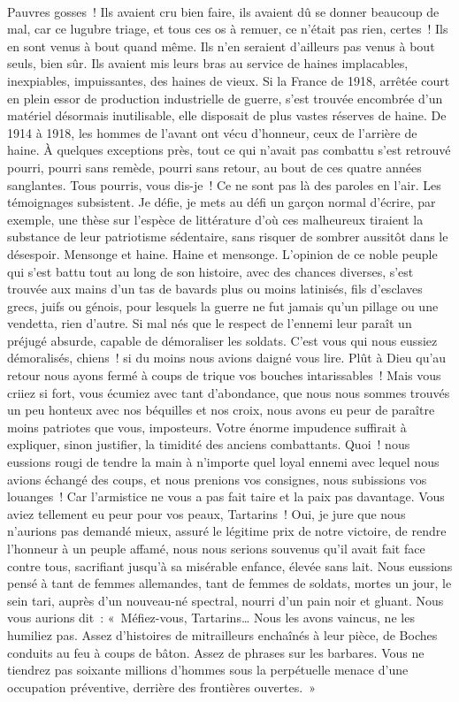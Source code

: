 \documentclass[french,twoside]{book} %
\newcommand{\astertri}{\medskip\par\centerline{\color{rubric}\large\selectfont{\syms ✻\,✻\,✻}}\medskip\par}%
\begin{document}
\astertri

\noindent  \par
Pauvres gosses ! Ils avaient cru bien faire, ils avaient dû se donner beaucoup de mal, car ce lugubre triage, et tous ces os à remuer, ce n’était pas rien, certes ! Ils en sont venus à bout quand même. Ils n’en seraient d’ailleurs pas venus à bout seuls, bien sûr. Ils avaient mis leurs bras au service de haines implacables, inexpiables, impuissantes, des haines de vieux. Si la France de 1918, arrêtée court en plein essor de production industrielle de guerre, s’est trouvée encombrée d’un matériel désormais inutilisable, elle disposait de plus vastes réserves de haine. De 1914 à 1918, les hommes de l’avant ont vécu d’honneur, ceux de l’arrière de haine. À quelques exceptions près, tout ce qui n’avait pas combattu s’est retrouvé pourri, pourri sans remède, pourri sans retour, au bout de ces quatre années sanglantes. Tous pourris, vous dis-je ! Ce ne sont pas là des paroles en l’air. Les témoignages subsistent. Je défie, je mets au défi un garçon normal d’écrire, par exemple, une thèse sur l’espèce de littérature d’où ces malheureux tiraient la substance de leur patriotisme sédentaire, sans risquer de sombrer aussitôt dans le désespoir. Mensonge et haine. Haine et mensonge. L’opinion de ce noble peuple qui s’est battu tout au long de son histoire, avec des chances diverses, s’est trouvée aux mains d’un tas de bavards plus ou moins latinisés, fils d’esclaves grecs, juifs ou génois, pour lesquels la guerre ne fut jamais qu’un pillage ou une vendetta, rien d’autre. Si mal nés que le respect de l’ennemi leur paraît un préjugé absurde, capable de démoraliser les soldats. C’est vous qui nous eussiez démoralisés, chiens ! si du moins nous avions daigné vous lire. Plût à Dieu qu’au retour nous ayons fermé à coups de trique vos bouches intarissables ! Mais vous criiez si fort, vous écumiez avec tant d’abondance, que nous nous sommes trouvés un peu honteux avec nos béquilles et nos croix, nous avons eu peur de paraître moins patriotes que vous, imposteurs. Votre énorme impudence suffirait à expliquer, sinon justifier, la timidité des anciens combattants. Quoi ! nous eussions rougi de tendre la main à n’importe quel loyal ennemi avec lequel nous avions échangé des coups, et nous prenions vos consignes, nous subissions vos louanges ! Car l’armistice ne vous a pas fait taire et la paix pas davantage. Vous aviez tellement eu peur pour vos peaux, Tartarins ! Oui, je jure que nous n’aurions pas demandé mieux, assuré le légitime prix de notre victoire, de rendre l’honneur à un peuple affamé, nous nous serions souvenus qu’il avait fait face contre tous, sacrifiant jusqu’à sa misérable enfance, élevée sans lait. Nous eussions pensé à tant de femmes allemandes, tant de femmes de soldats, mortes un jour, le sein tari, auprès d’un nouveau-né spectral, nourri d’un pain noir et gluant. Nous vous aurions dit : « Méfiez-vous, Tartarins… Nous les avons vaincus, ne les humiliez pas. Assez d’histoires de mitrailleurs enchaînés à leur pièce, de Boches conduits au feu à coups de bâton. Assez de phrases sur les barbares. Vous ne tiendrez pas soixante millions d’hommes sous la perpétuelle menace d’une occupation préventive, derrière des frontières ouvertes. » 
\end{document}
